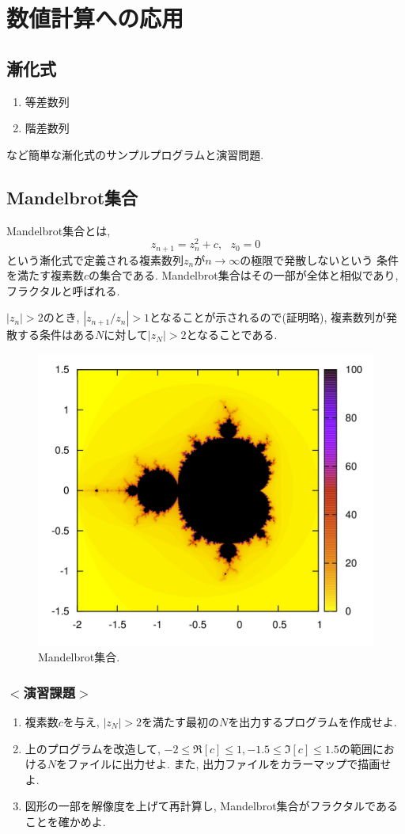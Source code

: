 \documentclass[a4j]{jsbook}
\begin{document}
\chapter{数値計算への応用}
\section{漸化式}
\begin{enumerate}
\item 等差数列
\item 階差数列
\end{enumerate}
など簡単な漸化式のサンプルプログラムと演習問題.

\section{Mandelbrot集合}
Mandelbrot集合とは,
\begin{equation}
z_{n+1}=z_n^2+c, \ \ \ z_0=0
\end{equation}
という漸化式で定義される複素数列$z_n$が$n \to \infty$の極限で発散しないという
条件を満たす複素数$c$の集合である.
Mandelbrot集合はその一部が全体と相似であり, フラクタルと呼ばれる.

$|z_n|>2$のとき, $|z_{n+1}/z_n|>1$となることが示されるので(証明略),
複素数列が発散する条件はある$N$に対して$|z_N|>2$となることである.

\begin{figure}[ht]
\centering
\includegraphics[width=0.75\linewidth]{source/figure/mandel}
\caption{Mandelbrot集合. }
\end{figure}

\subsection*{$<$演習課題$>$}
\begin{enumerate}
\item 複素数$c$を与え, $|z_N|>2$を満たす最初の$N$を出力するプログラムを作成せよ.
\item 上のプログラムを改造して, $-2 \le \Re[c] \le 1, -1.5 \le \Im[c] \le 1.5$の範囲における$N$をファイルに出力せよ.
また, 出力ファイルをカラーマップで描画せよ.
\item 図形の一部を解像度を上げて再計算し, Mandelbrot集合がフラクタルであることを確かめよ.
\end{enumerate}
\end{document}
